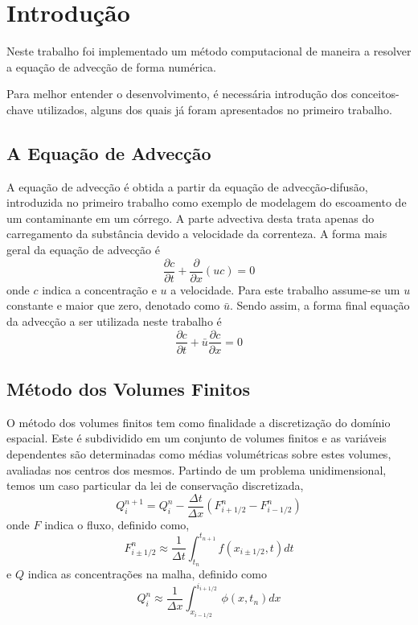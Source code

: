 \chapter{Introdução}
Neste trabalho foi implementado um método computacional de maneira a resolver
a equação de advecção de forma numérica.

Para melhor entender o desenvolvimento, é necessária introdução dos\linebreak
conceitos-chave utilizados, alguns dos quais já foram apresentados no primeiro
trabalho.

\section{A Equação de Advecção}
A equação de advecção é obtida a partir da equação de advecção-difusão,
introduzida no primeiro trabalho como exemplo de modelagem do escoamento de um
contaminante em um córrego. A parte advectiva desta trata apenas do
carregamento da substância devido a velocidade da correnteza. A forma mais
geral da equação de advecção é
\begin{equation}
    \frac{\partial c}{\partial t} + \frac{\partial}{\partial x}(uc) = 0
\end{equation}
onde $c$ indica a concentração e $u$ a velocidade. Para este trabalho
assume-se um $u$ constante e maior que zero, denotado como $\bar{u}$. Sendo
assim, a forma final equação da advecção a ser utilizada neste trabalho é
\begin{equation}\label{adv}
    \frac{\partial c}{\partial t} + \bar{u}\frac{\partial c}{\partial x} = 0
\end{equation}

\section{Método dos Volumes Finitos}
O método dos volumes finitos tem como finalidade a discretização do domínio
espacial. Este é subdividido em um conjunto de volumes finitos e as variáveis
dependentes são determinadas como médias volumétricas sobre estes volumes,
avaliadas nos centros dos mesmos. Partindo de um problema unidimensional, temos
um caso particular da lei de conservação discretizada,
\begin{equation}\label{lei de cons.}
    Q_i^{n+1} = Q_i^n - \frac{\Delta t}{\Delta x}\left(
        F_{i+1/2}^n - F_{i-1/2}^n
    \right)
\end{equation}
onde $F$ indica o fluxo, definido como,
\[
    F_{i \pm 1/2}^n
    \approx
    \frac{1}{\Delta t} \int_{t_n}^{t_{n+1}} f(x_{i \pm 1/2},t)dt
\]
e $Q$ indica as concentrações na malha, definido como
\[
    Q_i^n \approx \frac{1}{\Delta x} \int_{x_{i-1/2}}^{i_{i+1/2}} \phi(x,t_n)dx
\]

